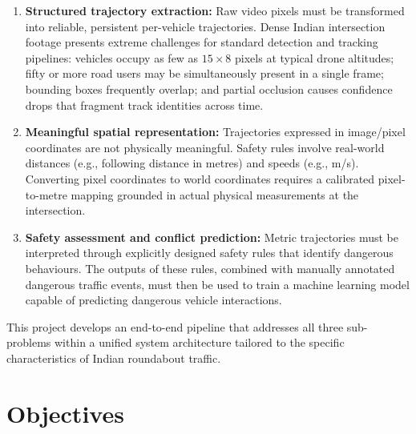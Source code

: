 \begin{enumerate}
    \item \textbf{Structured trajectory extraction:}
          Raw video pixels must be transformed into reliable, persistent per-vehicle
          trajectories.  Dense Indian intersection footage presents extreme challenges for
          standard detection and tracking pipelines: vehicles occupy as few as $15 \times 8$
          pixels at typical drone altitudes; fifty or more road users may be simultaneously
          present in a single frame; bounding boxes frequently overlap; and partial occlusion
          causes confidence drops that fragment track identities across time.

    \item \textbf{Meaningful spatial representation:}
          Trajectories expressed in image/pixel coordinates are not physically meaningful.
          Safety rules involve real-world distances (e.g., following distance in metres) and
          speeds (e.g., m/s).  Converting pixel coordinates to world coordinates requires a
          calibrated pixel-to-metre mapping grounded in actual physical measurements at the
          intersection.

    \item \textbf{Safety assessment and conflict prediction:}
          Metric trajectories must be interpreted through explicitly designed safety rules
          that identify dangerous behaviours.  The outputs of these rules, combined with
          manually annotated dangerous traffic events, must then be used to train a machine
          learning model capable of predicting dangerous vehicle interactions.
\end{enumerate}

This project develops an end-to-end pipeline that addresses all three sub-problems within a
unified system architecture tailored to the specific characteristics of Indian roundabout
traffic.

\section{Objectives}

